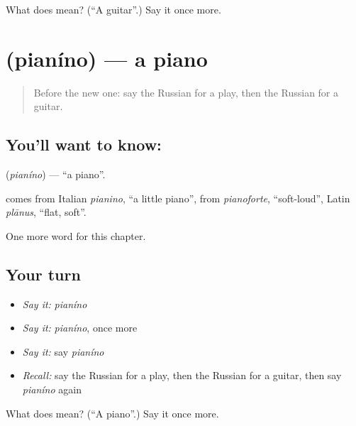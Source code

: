 \begin{tcolorbox}[breakable,colback=teal!4,colframe=teal!35!black,title={Before you move on}]
What does  mean? (\textquotedblleft{}A guitar\textquotedblright{}.) Say it once more.
\end{tcolorbox}
\section[\texorpdfstring{\ru{пианино} (pianíno)}{пианино (pianíno)}]{ (pianíno) — a piano}

\label{lesson:RU-C197-pianino}



\begin{quote}
Before the new one: say the Russian for a play, then the Russian for a guitar.
\end{quote}

\subsection*{You'll want to know: }
\textbf{} (\emph{pianíno}) — \textquotedblleft{}a piano\textquotedblright{}.

\begin{cousinweb}
\textbf{} comes from Italian \emph{pianino}, \textquotedblleft{}a little piano\textquotedblright{}, from \emph{pianoforte}, \textquotedblleft{}soft-loud\textquotedblright{}, Latin \emph{plānus}, \textquotedblleft{}flat, soft\textquotedblright{}.
\end{cousinweb}

\begin{grammarlens}[title={What you've built}]
One more word for this chapter.
\end{grammarlens}

\subsection*{Your turn}
\begin{itemize}
\raggedright
  \item \emph{Say it:} \emph{pianíno}
  \item \emph{Say it:} \emph{pianíno}, once more
  \item \emph{Say it:} say \emph{pianíno}
  \item \emph{Recall:} say the Russian for a play, then the Russian for a guitar, then say \emph{pianíno} again
\end{itemize}

\begin{tcolorbox}[breakable,colback=teal!4,colframe=teal!35!black,title={Before you move on}]
What does  mean? (\textquotedblleft{}A piano\textquotedblright{}.) Say it once more.
\end{tcolorbox}
